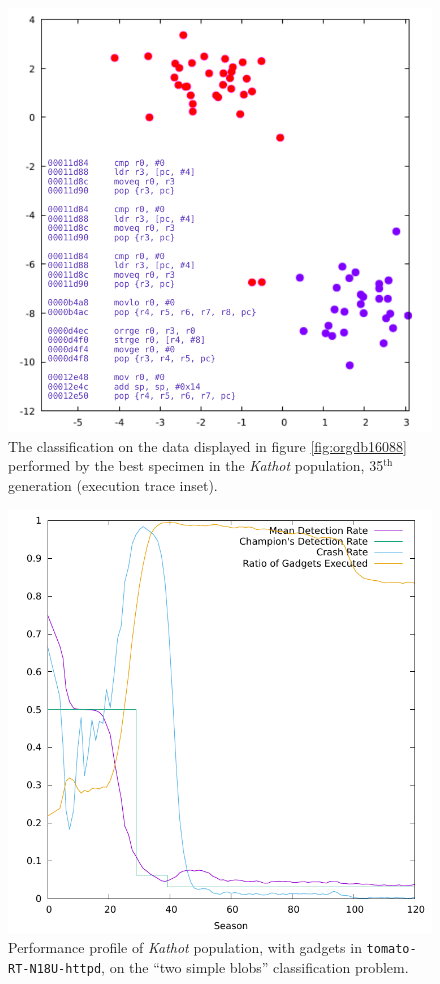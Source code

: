 \documentclass[12pt,glossary]{dalthesis}
\begin{document}
\begin{figure}[htbp]
\centering
\includegraphics[width=.9\linewidth]{../images/plots/kathot_champion_18916_blobs_disas.pdf}
\caption{\label{fig:orgba66058}
The classification on the data displayed in figure \ref{fig:orgdb16088} performed by the best specimen in the \emph{Kathot} population, 35\(^{\text{th}}\) generation (execution trace inset).}
\end{figure}

\begin{figure}[htbp]
\centering
\includegraphics[width=.9\linewidth]{../images/plots/kathot_fitness.pdf}
\caption{\label{fig:orgeb45e55}
Performance profile of \emph{Kathot} population, with gadgets in \texttt{tomato-RT-N18U-httpd}, on the ``two simple blobs'' classification problem.}
\end{figure}
\end{document}
